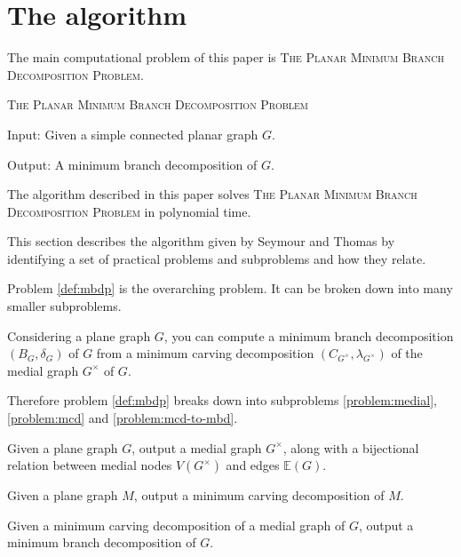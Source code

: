 \documentclass{article}
\begin{document}

\section{The algorithm}

	The main computational problem of this paper is \textsc{The Planar Minimum Branch Decomposition Problem}.

	\begin{definition}\label{def:mbdp}
		\textsc{The Planar Minimum Branch Decomposition Problem}

		Input: Given a simple connected planar graph $G$.

		Output: A minimum branch decomposition of $G$.
	\end{definition}

	The algorithm described in this paper solves \textsc{The Planar Minimum Branch Decomposition Problem} in polynomial time.

	This section describes the algorithm given by Seymour and Thomas\cite{ST93} by identifying a set of practical problems and subproblems and how they relate.
	
	Problem \ref{def:mbdp} is the overarching problem. It can be broken down into many smaller subproblems.

	Considering a plane graph $G$, you can compute a minimum branch decomposition $(B_G, \delta_G)$ of $G$ from a minimum carving decomposition $(C_{G^\times}, \lambda_{G^\times})$ of the medial graph $G^\times$ of $G$.

	Therefore problem \ref{def:mbdp} breaks down into subproblems \ref{problem:medial}, \ref{problem:mcd} and \ref{problem:mcd-to-mbd}.

	\begin{problem}\label{problem:medial}
		Given a plane graph $G$, output a medial graph $G^\times$, along with a bijectional relation between medial nodes $V(G^\times)$ and edges $\mathbb{E}(G)$.
	\end{problem}

	\begin{problem}\label{problem:mcd}
		Given a plane graph $M$, output a minimum carving decomposition of $M$.
	\end{problem}

	\begin{problem}\label{problem:mcd-to-mbd}
		Given a minimum carving decomposition of a medial graph of $G$, output a minimum branch decomposition of $G$.
	\end{problem}
\end{document}
